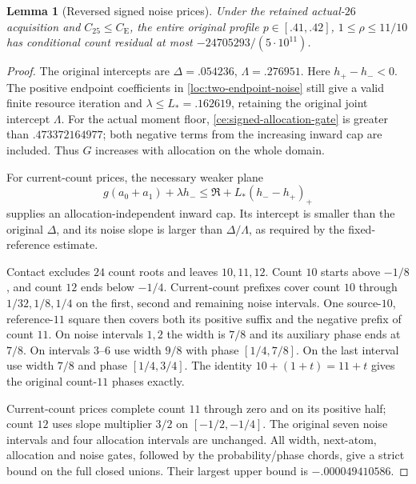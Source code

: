 \documentclass[aop,preprint]{imsart}
\newtheorem{lemma}[theorem]{Lemma}
\theoremstyle{definition}
\newcommand{\CE}{C_{\mathrm E}}
\numberwithin{equation}{section}
\begin{document}
\begin{lemma}[Reversed signed noise prices]\label{fc:low41}
Under the retained actual-$26$ acquisition and $C_{25}\le\CE$,
the entire original profile $p\in[.41,.42]$, $1\le\rho\le11/10$
has conditional count residual at most $-24705293/(5\cdot10^{11})$.
\end{lemma}
\begin{proof}
The original intercepts are $\Delta=.054236$, $\Lambda=.276951$.
Here $h_+-h_-<0$. The positive endpoint coefficients in
\eqref{loc:two-endpoint-noise} still give a valid finite resource
iteration and $\lambda\le L_*=.162619$, retaining the original
joint intercept $\Lambda$. For the actual moment floor,
\eqref{ce:signed-allocation-gate} is greater than $.473372164977$;
both negative terms from the increasing inward cap are included.
Thus $G$ increases with allocation on the whole domain.

For current-count prices, the necessary weaker plane
\[
 g(a_0+a_1)+\lambda h_-
 \le\mathfrak R+L_*(h_--h_+)_+
\]
supplies an allocation-independent inward cap. Its intercept is
smaller than the original $\Delta$, and its noise slope is larger
than $\Delta/\Lambda$, as required by the fixed-reference estimate.

Contact excludes $24$ count roots and leaves $10,11,12$.
Count $10$ starts above $-1/8$, and count $12$ ends below $-1/4$.
Current-count prefixes cover count $10$ through $1/32,1/8,1/4$
on the first, second and remaining noise intervals.
One source-$10$, reference-$11$ square then covers both its
positive suffix and the negative prefix of count $11$.
On noise intervals $1,2$ the width is $7/8$ and its auxiliary
phase ends at $7/8$. On intervals $3$--$6$ use width $9/8$
with phase $[1/4,7/8]$. On the last interval use width $7/8$
and phase $[1/4,3/4]$. The identity $10+(1+t)=11+t$
gives the original count-$11$ phases exactly.

Current-count prices complete count $11$ through zero and on its
positive half; count $12$ uses slope multiplier $3/2$ on
$[-1/2,-1/4]$. The original seven noise intervals and four
allocation intervals are unchanged. All width, next-atom,
allocation and noise gates, followed by the probability/phase
chords, give a strict bound on the full closed unions.
Their largest upper bound is $-.000049410586$.
\end{proof}
\end{document}
